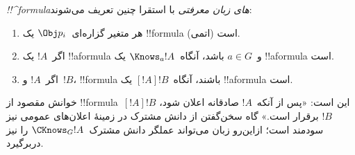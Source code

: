 \documentclass[../../../include/open-logic-section]{subfiles}
\begin{document}
\begin{defn}
  \emph{!!^{formula}های زبان معرفتی} با استقرا چنین تعریف می‌شوند:
  \begin{enumerate}


  \item هر متغیر گزاره‌ای~$\Obj p_i$ یک !!{formula} (اتمی) است.






  \item اگر~$!A$ یک !!a{formula} و~$a \in G$ باشد، آنگاه~$\Knows_a !A$
  یک !!a{formula} است.
  
  \item اگر~$!A$ و~$!B$، !!{formula} باشند، آنگاه~$[!A] !B$ یک
  !!a{formula} است.

\end{enumerate}
\end{defn}

خوانش مقصود از !!{formula}~$[!A] !B$ این است: «پس از آنکه~$!A$
صادقانه اعلان شود، $!B$ برقرار است.» گاه سخن‌گفتن از دانش مشترک در
زمینهٔ اعلان‌های عمومی نیز سودمند است؛ ازاین‌رو زبان می‌تواند عملگر
دانش مشترک~$\CKnows_G !A$ را نیز دربرگیرد.
\end{document}
